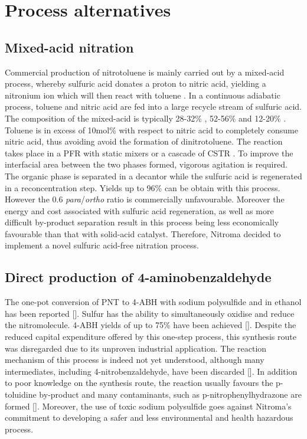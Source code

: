 \section{Process alternatives}
\label{app:alternatives}

\subsection{Mixed-acid nitration}
Commercial production of nitrotoluene is mainly carried out by a mixed-acid process, whereby sulfuric acid donates a proton to nitric acid, yielding a nitronium ion which will then react with toluene \cite{halder_nitration_2007}. In a continuous adiabatic process, toluene and nitric acid are fed into a large recycle stream of sulfuric acid. The composition of the mixed-acid is typically 28-32\% , 52-56\%  and 12-20\%  \cite{dugal_nitrobenzene_2005}. Toluene is in excess of 10mol\% with respect to nitric acid to completely consume nitric acid, thus avoiding avoid the formation of dinitrotoluene. The reaction takes place in a PFR with static mixers or a cascade of CSTR \cite{dugal_nitrobenzene_2005}. To improve the interfacial area between the two phases formed, vigorous agitation is required. The organic phase is separated in a decantor while the sulfuric acid is regenerated in a reconcentration step. Yields up to 96\% can be obtain with this process. However the 0.6 \textit{para}/\textit{ortho} ratio is commercially unfavourable. Moreover the energy and cost associated with sulfuric acid regeneration, as well as more difficult by-product separation result in this process being less economically favourable than that with solid-acid catalyst. Therefore, Nitroma decided to implement a novel sulfuric acid-free nitration process.



\subsection{Direct production of 4-aminobenzaldehyde}
The one-pot conversion of PNT to 4-ABH with sodium polysulfide and  in ethanol has been reported []. Sulfur has the ability to simultaneously oxidise and reduce the nitromolecule. 4-ABH yields of up to 75\% have been achieved []. Despite the reduced capital expenditure offered by this one-step process, this synthesis route was disregarded due to its unproven industrial application. The reaction mechanism of this process is indeed not yet understood, although many intermediates, including 4-nitrobenzaldehyde, have been discarded []. In addition to poor knowledge on the synthesis route, the reaction usually favours the p-toluidine by-product and many contaminants, such as p-nitrophenylhydrazone are formed []. Moreover, the use of toxic sodium polysulfide goes against Nitroma's commitment to developing a safer and less environmental and health hazardous process.


